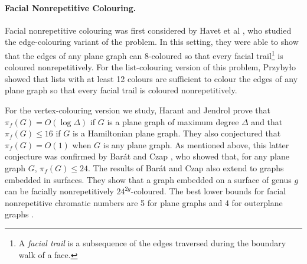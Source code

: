 \documentclass{patmorin}
\begin{document}
\paragraph{Facial Nonrepetitive Colouring.}

Facial nonrepetitive colouring was first considered by Havet et
al \cite{havet2011facial}, who studied the edge-colouring variant
of the problem.  In this setting, they were able to show that
the edges of any plane graph can 8-coloured so that every facial
trail\footnote{A \emph{facial trail} is a subsequence of the
edges traversed during the boundary walk of a face.} is coloured
nonrepetitively.  For the list-colouring version of this problem,
Przyby{\l}o \cite{przybylo2013facial} showed that lists with at least
12 colours are sufficient to colour the edges of any plane graph so that
every facial trail is coloured nonrepetitively.

For the vertex-colouring version we study, Harant and Jendrol
\cite{harant2012nonrepetitive} prove that $\pi_f(G)=O(\log\Delta)$ if
$G$ is a plane graph of maximum degree $\Delta$ and that $\pi_f(G)\le
16$ if $G$ is a Hamiltonian plane graph.  They also conjectured that
$\pi_f(G)=O(1)$ when $G$ is any plane graph.  As mentioned above, this
latter conjecture was confirmed by Barát and Czap \cite{barat2013facial},
who showed that, for any plane graph $G$, $\pi_f(G)\le 24$.  The results
of Barát and Czap \cite{barat2013facial} also extend to graphs embedded
in surfaces.  They show that a graph embedded on a surface of genus $g$
can be facially nonrepetitively $24^{2g}$-coloured.  The best lower
bounds for facial nonrepetitive chromatic numbers are 5 for plane graphs
and 4 for outerplane graphs \cite{barat2013facial}.


%
 
\end{document}
